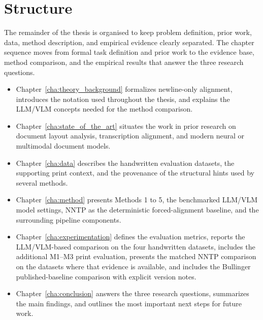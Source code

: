 \section{Structure}
\label{sec:intro_structure}

The remainder of the thesis is organised to keep problem definition, prior work, data, method description, and empirical evidence clearly separated. The chapter sequence moves from formal task definition and prior work to the evidence base, method comparison, and the empirical results that answer the three research questions.

\begin{itemize}
  \item Chapter~\ref{cha:theory_background} formalizes newline-only alignment, introduces the notation used throughout the thesis, and explains the LLM/VLM concepts needed for the method comparison.
  \item Chapter~\ref{cha:state_of_the_art} situates the work in prior research on document layout analysis, transcription alignment, and modern neural or multimodal document models.
  \item Chapter~\ref{cha:data} describes the handwritten evaluation datasets, the supporting print context, and the provenance of the \OCRHTR structural hints used by several methods.
  \item Chapter~\ref{cha:method} presents Methods 1 to 5, the benchmarked LLM/VLM model settings, NNTP as the deterministic forced-alignment baseline, and the surrounding \OCRHTR pipeline components.
  \item Chapter~\ref{cha:experimentation} defines the evaluation metrics, reports the LLM/VLM-based comparison on the four handwritten datasets, includes the additional M1--M3 print evaluation, presents the matched NNTP comparison on the datasets where that evidence is available, and includes the Bullinger published-baseline comparison with explicit version notes.
  \item Chapter~\ref{cha:conclusion} answers the three research questions, summarizes the main findings, and outlines the most important next steps for future work.
\end{itemize}

